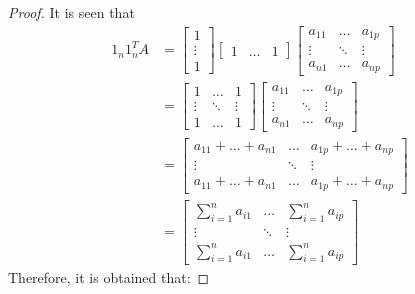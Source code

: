 \documentclass[11pt]{article}
\theoremstyle{definition}
\theoremstyle{remark}
\theoremstyle{remark}
\theoremstyle{remark}
\theoremstyle{proof}
\begin{document}
\begin{proof}
  It is seen that
  \begin{align*}
    1_{n}1_{n}^{T}A
    &=\begin{bmatrix}
      1 \\
      \vdots \\
      1
    \end{bmatrix}
    \begin{bmatrix}
      1 & \ldots & 1
    \end{bmatrix}
                   \begin{bmatrix}
                     a_{11} & \ldots & a_{1p} \\
                     \vdots & \ddots & \vdots \\
                     a_{n1} & \ldots & a_{np}
                   \end{bmatrix} \\
    &=
      \begin{bmatrix}
        1 & \ldots & 1 \\
        \vdots & \ddots & \vdots \\
        1 & \ldots & 1
      \end{bmatrix}
                     \begin{bmatrix}
                       a_{11} & \ldots & a_{1p} \\
                       \vdots & \ddots & \vdots \\
                       a_{n1} & \ldots & a_{np}
                     \end{bmatrix} \\
    &=
      \begin{bmatrix}
        a_{11} + \ldots + a_{n1} & \ldots & a_{1p} + \ldots + a_{np} \\
        \vdots & \ddots & \vdots \\
        a_{11} + \ldots + a_{n1} & \ldots & a_{1p} + \ldots + a_{np}
      \end{bmatrix} \\
    &=
      \begin{bmatrix}
        \displaystyle\sum_{i=1}^{n}a_{i1} & \ldots & \displaystyle\sum_{i=1}^{n}a_{ip} \\
        \vdots & \ddots & \vdots \\
        \displaystyle\sum_{i=1}^{n}a_{i1} & \ldots & \displaystyle\sum_{i=1}^{n}a_{ip}
      \end{bmatrix}
  \end{align*}
  Therefore, it is obtained that:

\end{proof}
\end{document}
